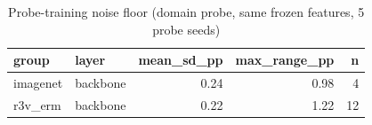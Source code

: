 \begin{table}
\caption{Probe-training noise floor (domain probe, same frozen features, 5 probe seeds)}
\label{tab:leak_noise_floor}
\begin{tabular}{llrrr}
\toprule
group & layer & mean\_sd\_pp & max\_range\_pp & n \\
\midrule
imagenet & backbone & 0.24 & 0.98 & 4 \\
r3v\_erm & backbone & 0.22 & 1.22 & 12 \\
\bottomrule
\end{tabular}
\end{table}
